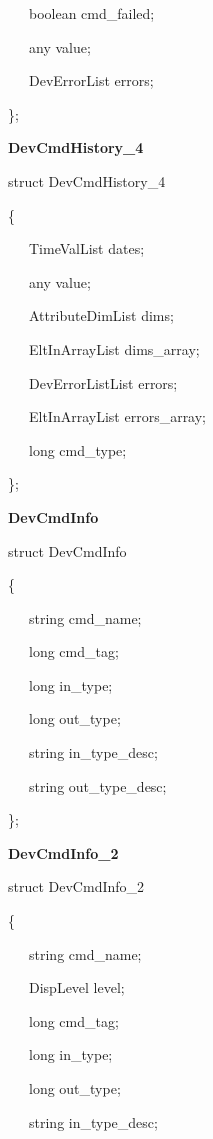 ~~~boolean cmd\_failed;

~~~any value;

~~~DevErrorList errors;

\};\\

\begin{flushleft}
\textbf{DevCmdHistory\_4}
\par\end{flushleft}

struct DevCmdHistory\_4

\{

~~~TimeValList dates;

~~~any value;

~~~AttributeDimList dims;

~~~EltInArrayList dims\_array;

~~~DevErrorListList errors;

~~~EltInArrayList errors\_array;

~~~long cmd\_type;

\};\\

\begin{flushleft}
\textbf{DevCmdInfo}
\par\end{flushleft}

struct DevCmdInfo

\{

~~~string cmd\_name;

~~~long cmd\_tag;

~~~long in\_type;

~~~long out\_type;

~~~string in\_type\_desc;

~~~string out\_type\_desc;

\};\\

\begin{flushleft}
\textbf{DevCmdInfo\_2}
\par\end{flushleft}

struct DevCmdInfo\_2

\{

~~~string cmd\_name;

~~~DispLevel level;

~~~long cmd\_tag;

~~~long in\_type;

~~~long out\_type;

~~~string in\_type\_desc;

